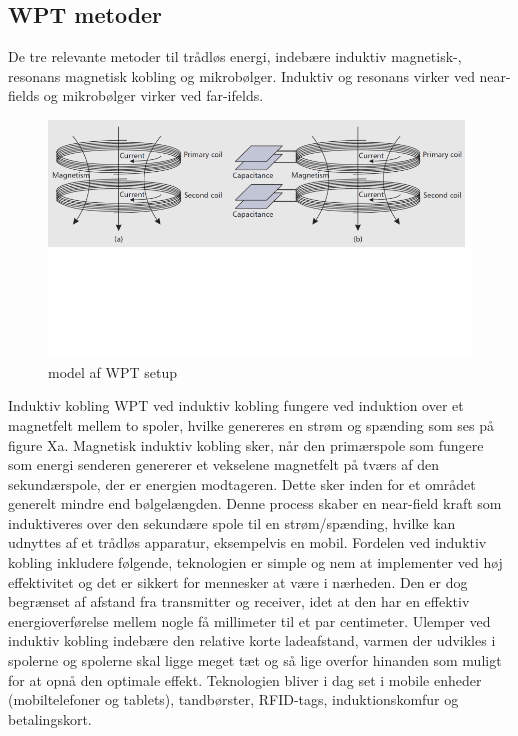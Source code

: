 \subsection{WPT metoder}
De tre relevante metoder til trådløs energi, indebære induktiv magnetisk-, resonans magnetisk kobling og mikrobølger. Induktiv og resonans virker ved near-fields og mikrobølger virker ved far-ifelds.

\begin{figure}[H]
\centering
\includegraphics[scale=0.5]{Vildledning/Schematics/induktiv_resonans}
\caption{model af WPT setup}
\label{model af WPT setup}
\end{figure}

Induktiv kobling 
WPT ved induktiv kobling fungere ved induktion over et magnetfelt mellem to spoler, hvilke genereres en strøm og spænding som ses på figure Xa. Magnetisk induktiv kobling sker, når den primærspole som fungere som energi senderen genererer et vekselene magnetfelt på tværs af den sekundærspole, der er energien modtageren. Dette sker inden for et området generelt mindre end bølgelængden. Denne process skaber en near-field kraft som induktiveres over den sekundære spole til en strøm/spænding, hvilke kan udnyttes af et trådløs apparatur, eksempelvis en mobil. 
Fordelen ved induktiv kobling inkludere følgende, teknologien er simple og nem at implementer ved høj effektivitet og det er sikkert for mennesker at være i nærheden. Den er dog begrænset af afstand fra transmitter og receiver, idet at den har en effektiv energioverførelse mellem nogle få millimeter til et par centimeter. Ulemper ved induktiv kobling indebære den relative korte ladeafstand, varmen der udvikles i spolerne og spolerne skal ligge meget tæt og så lige overfor hinanden som muligt for at opnå den optimale effekt.
Teknologien bliver i dag set i mobile enheder (mobiltelefoner og tablets), tandbørster, RFID-tags, induktionskomfur og betalingskort.

